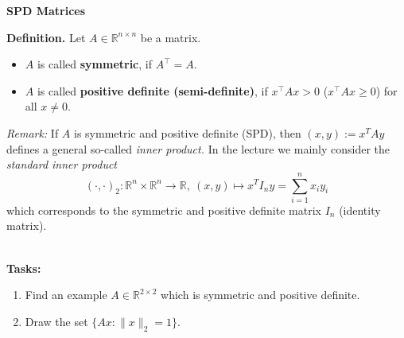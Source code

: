 \textbf{SPD Matrices}

{\color{navy}
	\textbf{Definition.} Let  $A\in\mathbb{R}^{n \times n}$ be a matrix.
	\begin{itemize}
		\item $A$ is called \textbf{symmetric}, if $A^\top = A$.
		\item $A$ is called \textbf{positive definite (semi-definite)}, if $x^\top Ax>0$ ($x^\top Ax\geq0$) for all $x\neq 0$.
	\end{itemize}
\textit{Remark:} If $A$ is symmetric and positive definite (SPD), then $(x,y) := x^T A y $ defines a general so-called \textit{inner product.} In the lecture we mainly consider the \textit{standard inner product} $$(\cdot,\cdot)_2\colon \mathbb{R}^n\times \mathbb{R}^n \to \mathbb{R},~ (x,y) \mapsto x^TI_ny=\sum_{i=1}^n x_i y_i$$ which corresponds to the symmetric and positive definite matrix $I_n$ (identity matrix).\\
}
~\\
\textbf{Tasks:}
\begin{enumerate}
	\item Find an example $A \in \mathbb{R}^{2 \times 2}$ which is symmetric and positive definite.
	\item Draw the set $\{ Ax\colon \|x\|_2 = 1\}$.
\end{enumerate}



